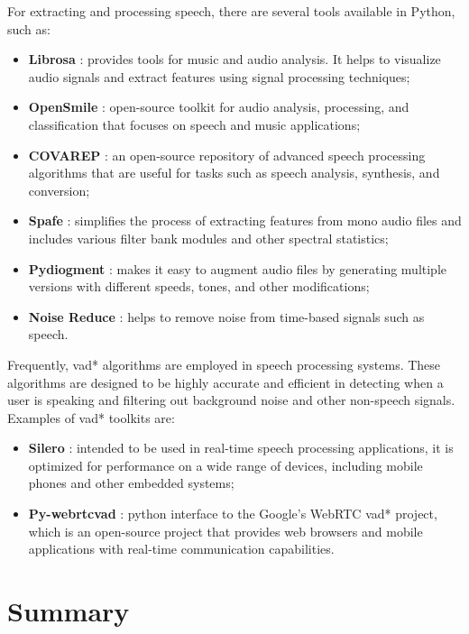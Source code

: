 For extracting and processing speech, there are several tools available in Python, such as:
\begin{itemize}
	\item \textbf{Librosa} \cite{Librosa}: provides tools for music and audio analysis. It helps to visualize audio signals and extract features using signal processing techniques;
	\item \textbf{OpenSmile} \cite{Eyben2010}: open-source toolkit for audio analysis, processing, and classification that focuses on speech and music applications;
	\item \textbf{COVAREP} \cite{Degottex2014}: an open-source repository of advanced speech processing algorithms that are useful for tasks such as speech analysis, synthesis, and conversion;
	\item \textbf{Spafe} \cite{spafe}: simplifies the process of extracting features from mono audio files and includes various filter bank modules and other spectral statistics;
	\item \textbf{Pydiogment} \cite{ayoubmalek2020}: makes it easy to augment audio files by generating multiple versions with different speeds, tones, and other modifications;
	\item \textbf{Noise Reduce} \cite{tim_sainburg_2019_3243139,sainburg2020finding}: helps to remove noise from time-based signals such as speech.
\end{itemize}

Frequently, \ac{vad*} algorithms are employed in speech processing systems. These algorithms are designed to be highly accurate and efficient in detecting when a user is speaking and filtering out background noise and other non-speech signals. Examples of \ac{vad*} toolkits are:

\begin{itemize}
	\item \textbf{Silero} \cite{SileroVAD}: intended to be used in real-time speech processing applications, it is optimized for performance on a wide range of devices, including mobile phones and other embedded systems;
	
	\item \textbf{Py-webrtcvad} \cite{WebRTCVad}: python interface to the Google's WebRTC \ac{vad*} project, which is an open-source project that provides web browsers and mobile applications with real-time communication capabilities.
\end{itemize}


\section{Summary}


